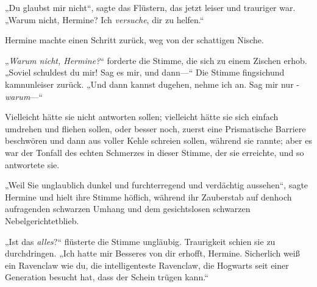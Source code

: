 „Du glaubst mir nicht“, sagte das Flüstern, das jetzt leiser und trauriger war. „Warum nicht, Hermine? Ich \emph{versuche}, dir zu helfen.“

Hermine machte einen Schritt zurück, weg von der schattigen Nische.

„\emph{Warum nicht, Hermine?}“ forderte die Stimme, die sich zu einem Zischen erhob. „Soviel schuldest du mir! Sag es mir, und dann—“ Die Stimme fingsichund kamnunleiser zurück. „Und dann kannst dugehen, nehme ich an. Sag mir nur -\emph{warum}—“

Vielleicht hätte sie nicht antworten sollen; vielleicht hätte sie sich einfach umdrehen und fliehen sollen, oder besser noch, zuerst eine Prismatische Barriere beschwören und dann aus voller Kehle schreien sollen, während sie rannte; aber es war der Tonfall des echten Schmerzes in dieser Stimme, der sie erreichte, und so antwortete sie.

„Weil Sie unglaublich dunkel und furchterregend und verdächtig aussehen“, sagte Hermine und hielt ihre Stimme höflich, während ihr Zauberstab auf denhoch aufragenden schwarzen Umhang und dem gesichtslosen schwarzen Nebelgerichtetblieb.

„Ist das \emph{alles}?“ flüsterte die Stimme ungläubig. Traurigkeit schien sie zu durchdringen. „Ich hatte mir Besseres von dir erhofft, Hermine. Sicherlich weiß ein Ravenclaw wie du, die intelligenteste Ravenclaw, die Hogwarts seit einer Generation besucht hat, dass der Schein trügen kann.“

